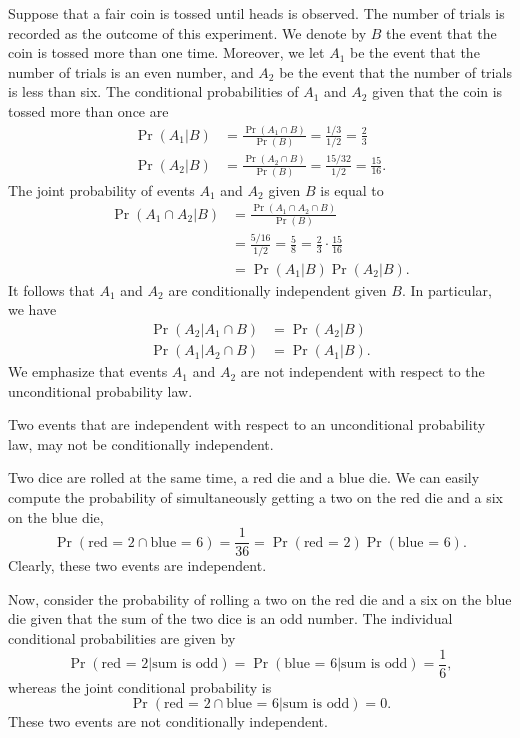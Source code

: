 \begin{example}
Suppose that a fair coin is tossed until heads is observed.
The number of trials is recorded as the outcome of this experiment.
We denote by $B$ the event that the coin is tossed more than one time.
Moreover, we let $A_1$ be the event that the number of trials is an even number, and $A_2$ be the event that the number of trials is less than six.
The conditional probabilities of $A_1$ and $A_2$ given that the coin is tossed more than once are
\begin{align*}
\Pr (A_1 | B) &= \frac{ \Pr (A_1 \cap B) }{ \Pr (B) }
= \frac{1/3}{1/2} = \frac{2}{3} \\
\Pr (A_2 | B) &= \frac{ \Pr (A_2 \cap B) }{ \Pr (B) }
= \frac{15/32}{1/2} = \frac{15}{16} .
\end{align*}
The joint probability of events $A_1$ and $A_2$ given $B$ is equal to
\begin{equation*}
\begin{split}
\Pr (A_1 \cap A_2 | B) &= \frac{ \Pr (A_1 \cap A_2 \cap B) }{ \Pr (B) } \\
&= \frac{5/16}{1/2} = \frac{5}{8} = \frac{2}{3} \cdot \frac{15}{16} \\
&= \Pr (A_1 | B) \Pr (A_2 | B) .
\end{split}
\end{equation*}
It follows that $A_1$ and $A_2$ are conditionally independent given $B$.
In particular, we have
\begin{align*}
\Pr (A_2 | A_1 \cap  B) &= \Pr (A_2 | B) \\
\Pr (A_1 | A_2 \cap  B) &= \Pr (A_1 | B) .
\end{align*}
We emphasize that events $A_1$ and $A_2$ are not independent with respect to the unconditional probability law.
\end{example}

Two events that are independent with respect to an unconditional probability law, may not be conditionally independent.

\begin{example}
Two dice are rolled at the same time, a red die and a blue die.
We can easily compute the probability of simultaneously getting a two on the red die and a six on the blue die,
\begin{equation*}
\Pr (\text{red = 2} \cap \text{blue = 6}) = \frac{1}{36}
= \Pr (\text{red = 2}) \Pr (\text{blue = 6}) .
\end{equation*}
Clearly, these two events are independent.

Now, consider the probability of rolling a two on the red die and a six on the blue die given that the sum of the two dice is an odd number.
The individual conditional probabilities are given by
\begin{equation*}
\Pr (\text{red = 2} | \text{sum is odd})
= \Pr (\text{blue = 6} | \text{sum is odd})
= \frac{1}{6},
\end{equation*}
whereas the joint conditional probability is
\begin{equation*}
\Pr (\text{red = 2} \cap \text{blue = 6} | \text{sum is odd})
= 0 .
\end{equation*}
These two events are not conditionally independent.
\end{example}

